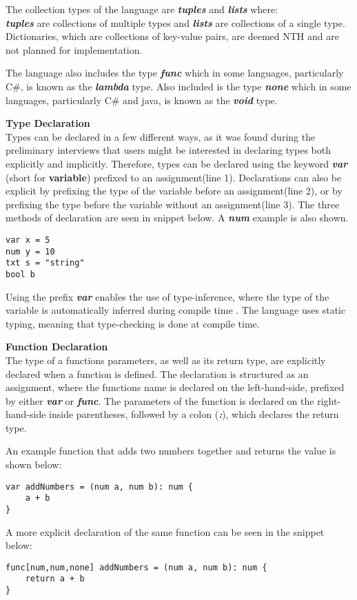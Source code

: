 The collection types of the language are \textbf{\textit{tuples}} and \textbf{\textit{lists}} where:\\
\textbf{\textit{tuples}} are collections of multiple types and \textbf{\textit{lists}} are collections of a single type.
Dictionaries, which are collections of key-value pairs, are deemed NTH and are not planned for implementation. 

The language also includes the type \textbf{\textit{func}} which in some languages, particularly C\#, is known as the \textbf{\textit{lambda}} type.
Also included is the type \textbf{\textit{none}} which in some languages, particularly C\# and java, is known as the \textbf{\textit{void}} type. 

\textbf{Type Declaration}\\
Types can be declared in a few different ways, as it was found during the preliminary interviews that users might be interested in declaring types both explicitly and implicitly.
Therefore, types can be declared using the keyword \textbf{\textit{var}} (short for \textbf{variable\textit{}}) prefixed to an assignment(line 1).
Declarations can also be explicit by prefixing the type of the variable before an assignment(line 2), or by prefixing the type before the variable without an assignment(line 3).
The three methods of declaration are seen in snippet below.
A  \textbf{\textit{num}} example is also shown.
\begin{lstlisting}
var x = 5
num y = 10
txt s = "string"
bool b
\end{lstlisting}

Using the prefix \textbf{\textit{var}} enables the use of type-inference, where the type of the variable is automatically inferred during compile time \cite{typeinf}.
The language uses static typing, meaning that type-checking is done at compile time.

\textbf{Function Declaration}\\
The type of a functions parameters, as well as its return type, are explicitly declared when a function is defined. 
The declaration is structured as an assignment, where the functions name is declared on the left-hand-side, prefixed by either \textbf{\textit{var}} or \textbf{\textit{func}}. 
The parameters of the function is declared on the right-hand-side inside parentheses, followed by a colon (\textbf{\textit{:}}), which declares the return type. 

An example function that adds two numbers together and returns the value is shown below:
\begin{lstlisting}
var addNumbers = (num a, num b): num {
    a + b
}
\end{lstlisting} 
A more explicit declaration of the same function can be seen in the snippet below:
\begin{lstlisting}
func[num,num,none] addNumbers = (num a, num b): num {
	return a + b
}
\end{lstlisting}

